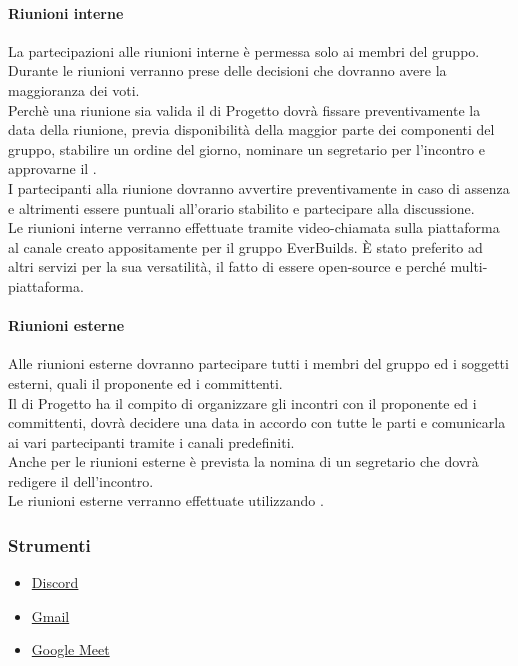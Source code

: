             \paragraph{Riunioni interne}
                La partecipazioni alle riunioni interne è permessa solo ai membri del gruppo.        \\
                Durante le riunioni verranno prese delle decisioni che dovranno avere la maggioranza dei voti.\\
                Perchè una riunione sia valida il  di Progetto dovrà fissare preventivamente la data della riunione, previa disponibilità della maggior parte dei componenti del gruppo, stabilire un ordine del giorno, nominare un segretario per l’incontro e approvarne il .\\
                I partecipanti alla riunione dovranno avvertire preventivamente in caso di assenza e altrimenti essere puntuali all’orario stabilito e partecipare alla discussione.\\
                Le riunioni interne verranno effettuate tramite video-chiamata sulla piattaforma  al canale creato appositamente per il gruppo EverBuilds. È stato preferito ad altri servizi per la sua versatilità, il fatto di essere open-source e perché multi-piattaforma.\\
            \paragraph{Riunioni esterne}
                Alle riunioni esterne dovranno partecipare tutti i membri del gruppo ed i soggetti esterni, quali il proponente ed i committenti.\\
                Il  di Progetto ha il compito di organizzare gli incontri con il proponente ed i committenti, dovrà decidere una data in accordo con tutte le parti e comunicarla ai vari partecipanti tramite i canali predefiniti.\\
                Anche per le riunioni esterne è prevista la nomina di un segretario che dovrà redigere il  dell’incontro.\\
                Le riunioni esterne verranno effettuate utilizzando .\\
        \subsubsection{Strumenti}
            \begin{itemize}
                \item \href{https://discordapp.com/company/}{Discord}
                \item \href{https://www.google.com/intl/it/gmail/about/}{Gmail }
                \item \href{https://meet.google.com/?hs=197\&pli=1\&authuser=0}{Google Meet}
            \end{itemize}
